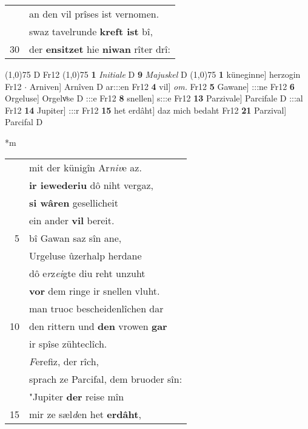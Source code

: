 \documentclass[8pt,a4paper,notitlepage]{article}
\begin{document}
\begin{table}[ht]
\begin{minipage}[t]{0.5\linewidth}
\begin{tabular}{rl}
 & an den vil prîses ist vernomen.\\ 
 & swaz tavelrunde \textbf{kreft ist} bî,\\ 
30 & der \textbf{en}\textbf{sitzet} hie \textbf{niwan} rîter drî:\\ 
\end{tabular}
\scriptsize
\line(1,0){75} \newline
D Fr12 \newline
\line(1,0){75} \newline
\textbf{1} \textit{Initiale} D  \textbf{9} \textit{Majuskel} D  \newline
\line(1,0){75} \newline
\textbf{1} küneginne] herzogin Fr12  $\cdot$ Arniven] Arnîven D ar:::en Fr12 \textbf{4} vil] \textit{om.} Fr12 \textbf{5} Gawane] :::ne Fr12 \textbf{6} Orgeluse] Orgelvͦse D :::e Fr12 \textbf{8} snellen] s:::e Fr12 \textbf{13} Parzivale] Parcifale D :::al Fr12 \textbf{14} Jupiter] :::r Fr12 \textbf{15} het erdâht] daz mich bedaht Fr12 \textbf{21} Parzival] Parcifal D \newline
\end{minipage}
\hspace{0.5cm}
\begin{minipage}[t]{0.5\linewidth}
\small
\begin{center}*m
\end{center}
\begin{tabular}{rl}
 & mit der künigîn Ar\textit{niv}e az.\\ 
 & \textbf{ir iewederiu} dô niht vergaz,\\ 
 & \textbf{si wâren} gesellicheit\\ 
 & ein ander \textbf{vil} bereit.\\ 
5 & bî Gawan saz sîn ane,\\ 
 & Urgeluse ûzerhalp herdane\\ 
 & dô e\textit{r}z\textit{ei}gte diu reht unzuht\\ 
 & \textbf{vor} dem ringe ir snellen vluht.\\ 
 & man truoc bescheidenlîchen dar\\ 
10 & den rittern und \textbf{den} vrowen \textbf{gar}\\ 
 & ir spîse zühteclîch.\\ 
 & \textit{F}erefiz, der rîch,\\ 
 & sprach ze Parcifal, dem bruoder sîn:\\ 
 & "Jupiter \textbf{der} reise mîn\\ 
15 & mir ze sæl\textit{d}en het \textbf{erdâht},\\ 

\end{tabular}
\end{minipage}
\end{table}
\end{document}
